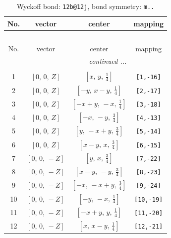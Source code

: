 \documentclass[fleqn,8pt]{jsarticle}
\begin{document}
\renewcommand{\arraystretch}{1.2}
\begin{longtable}{cccc}
\caption{Wyckoff bond: {\tt 12b@12j}, bond symmetry: {\tt m..}}
 \\
 \hline \hline
No. & vector & center & mapping \\ \hline \endfirsthead

\multicolumn{3}{l}{\tablename\ \thetable{}} \\
 \hline \hline
No. & vector & center & mapping \\ \hline \endhead

 \hline \hline
\multicolumn{3}{r}{\footnotesize\it continued ...} \\ \endfoot

 \hline \hline
\multicolumn{3}{r}{} \\ \endlastfoot

1 & $\left[ 0,\, 0,\, Z \right]$ & $\left[ x,\, y,\, \frac{1}{4} \right]$ & {\tt [1,-16]} \\ \hline
2 & $\left[ 0,\, 0,\, Z \right]$ & $\left[ - y,\, x - y,\, \frac{1}{4} \right]$ & {\tt [2,-17]} \\ \hline
3 & $\left[ 0,\, 0,\, Z \right]$ & $\left[ - x + y,\, - x,\, \frac{1}{4} \right]$ & {\tt [3,-18]} \\ \hline
4 & $\left[ 0,\, 0,\, Z \right]$ & $\left[ - x,\, - y,\, \frac{3}{4} \right]$ & {\tt [4,-13]} \\ \hline
5 & $\left[ 0,\, 0,\, Z \right]$ & $\left[ y,\, - x + y,\, \frac{3}{4} \right]$ & {\tt [5,-14]} \\ \hline
6 & $\left[ 0,\, 0,\, Z \right]$ & $\left[ x - y,\, x,\, \frac{3}{4} \right]$ & {\tt [6,-15]} \\ \hline
7 & $\left[ 0,\, 0,\, - Z \right]$ & $\left[ y,\, x,\, \frac{3}{4} \right]$ & {\tt [7,-22]} \\ \hline
8 & $\left[ 0,\, 0,\, - Z \right]$ & $\left[ x - y,\, - y,\, \frac{3}{4} \right]$ & {\tt [8,-23]} \\ \hline
9 & $\left[ 0,\, 0,\, - Z \right]$ & $\left[ - x,\, - x + y,\, \frac{3}{4} \right]$ & {\tt [9,-24]} \\ \hline
10 & $\left[ 0,\, 0,\, - Z \right]$ & $\left[ - y,\, - x,\, \frac{1}{4} \right]$ & {\tt [10,-19]} \\ \hline
11 & $\left[ 0,\, 0,\, - Z \right]$ & $\left[ - x + y,\, y,\, \frac{1}{4} \right]$ & {\tt [11,-20]} \\ \hline
12 & $\left[ 0,\, 0,\, - Z \right]$ & $\left[ x,\, x - y,\, \frac{1}{4} \right]$ & {\tt [12,-21]} \\
\end{longtable}
\end{document}

